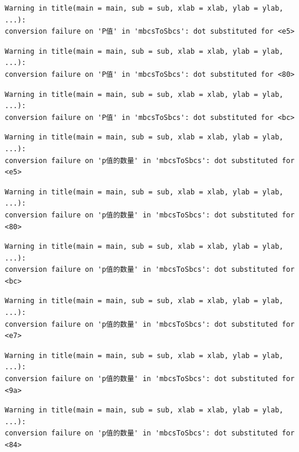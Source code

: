 \documentclass[
  letterpaper,
  DIV=11,
  numbers=noendperiod]{scrreprt}
\begin{document}
\begin{verbatim}
Warning in title(main = main, sub = sub, xlab = xlab, ylab = ylab, ...):
conversion failure on 'P值' in 'mbcsToSbcs': dot substituted for <e5>
\end{verbatim}

\begin{verbatim}
Warning in title(main = main, sub = sub, xlab = xlab, ylab = ylab, ...):
conversion failure on 'P值' in 'mbcsToSbcs': dot substituted for <80>
\end{verbatim}

\begin{verbatim}
Warning in title(main = main, sub = sub, xlab = xlab, ylab = ylab, ...):
conversion failure on 'P值' in 'mbcsToSbcs': dot substituted for <bc>
\end{verbatim}

\begin{verbatim}
Warning in title(main = main, sub = sub, xlab = xlab, ylab = ylab, ...):
conversion failure on 'p值的数量' in 'mbcsToSbcs': dot substituted for <e5>
\end{verbatim}

\begin{verbatim}
Warning in title(main = main, sub = sub, xlab = xlab, ylab = ylab, ...):
conversion failure on 'p值的数量' in 'mbcsToSbcs': dot substituted for <80>
\end{verbatim}

\begin{verbatim}
Warning in title(main = main, sub = sub, xlab = xlab, ylab = ylab, ...):
conversion failure on 'p值的数量' in 'mbcsToSbcs': dot substituted for <bc>
\end{verbatim}

\begin{verbatim}
Warning in title(main = main, sub = sub, xlab = xlab, ylab = ylab, ...):
conversion failure on 'p值的数量' in 'mbcsToSbcs': dot substituted for <e7>
\end{verbatim}

\begin{verbatim}
Warning in title(main = main, sub = sub, xlab = xlab, ylab = ylab, ...):
conversion failure on 'p值的数量' in 'mbcsToSbcs': dot substituted for <9a>
\end{verbatim}

\begin{verbatim}
Warning in title(main = main, sub = sub, xlab = xlab, ylab = ylab, ...):
conversion failure on 'p值的数量' in 'mbcsToSbcs': dot substituted for <84>
\end{verbatim}
\end{document}
